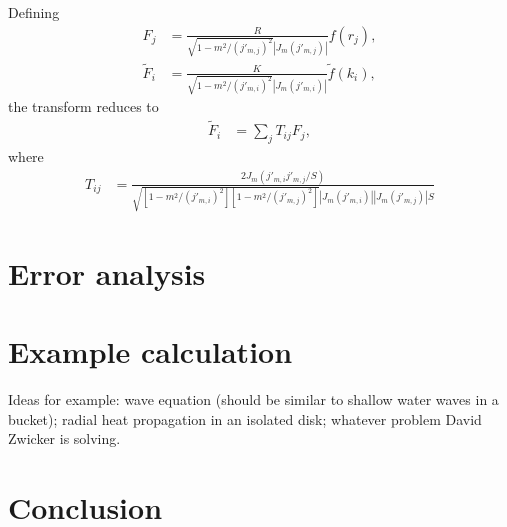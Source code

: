 \documentclass[aip,amsmath,amssymb,reprint,twocolumn]{revtex4-1}
\newcommand{\abs}[1]{\left|#1\right|}
\begin{document}
\begin{widetext}
Defining
\begin{align}
    F_j &= \frac{R}{\sqrt{1-m^2/(j'_{m,j})^2} \abs{J_m(j'_{m,j})}} f(r_j), \\
    \tilde{F}_i &= \frac{K}{\sqrt{1-m^2/(j'_{m,i})^2} \abs{J_m(j'_{m,i})}}  \tilde{f}(k_i),
\end{align}
the transform reduces to
\begin{align}
    \tilde{F}_i &= \sum_j T_{ij} F_j,
\end{align}
where
\begin{align}
    T_{ij} &= \frac{2 J_m(j'_{m,i} j'_{m,j}/S)}{\sqrt{\left[1-m^2/(j'_{m,i})^2\right]\left[1-m^2/(j'_{m,j})^2\right]} \abs{J_m(j'_{m,i})} \abs{J_m(j'_{m,j})} S}
\end{align}
\end{widetext}


\section{Error analysis}
\label{sec:ErrorAnalysis}

\section{Example calculation}
\label{sec:Example}
Ideas for example: wave equation (should be similar to shallow water waves in a bucket); radial heat propagation in an isolated disk; whatever problem David Zwicker is solving.

\section{Conclusion}
\label{sec:Conclusion}




\end{document}
